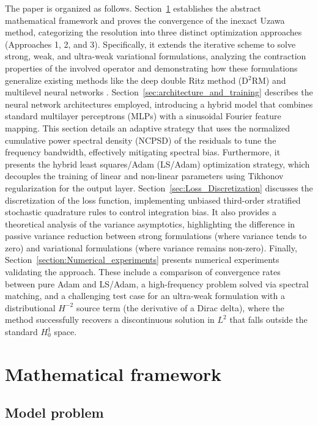 \documentclass{article}
\theoremstyle{definition}
\begin{document}
The paper is organized as follows. Section~\ref{sec:Math_framework} establishes the abstract mathematical framework and proves the convergence of the inexact Uzawa method, categorizing the resolution into three distinct optimization approaches (Approaches 1, 2, and 3). Specifically, it extends the iterative scheme to solve strong, weak, and ultra-weak variational formulations, analyzing the contraction properties of the involved operator and demonstrating how these formulations generalize existing methods like the deep double Ritz method (D$^2$RM) \cite{uriarte2023DoubleRitz} and multilevel neural networks \cite{aldirany2024multi, wang2024}. Section~\ref{sec:architecture_and_training} describes the neural network architectures employed, introducing a hybrid model that combines standard multilayer perceptrons (MLPs) with a sinusoidal Fourier feature mapping. This section details an adaptive strategy that uses the normalized cumulative power spectral density (NCPSD) of the residuals to tune the frequency bandwidth, effectively mitigating spectral bias. Furthermore, it presents the hybrid least squares/Adam (LS/Adam) optimization strategy, which decouples the training of linear and non-linear parameters using Tikhonov regularization for the output layer. Section~\ref{sec:Loss_Discretization} discusses the discretization of the loss function, implementing unbiased third-order stratified stochastic quadrature rules to control integration bias. It also provides a theoretical analysis of the variance asymptotics, highlighting the difference in passive variance reduction between strong formulations (where variance tends to zero) and variational formulations (where variance remains non-zero). Finally, Section~\ref{section:Numerical_experiments} presents numerical experiments validating the approach. These include a comparison of convergence rates between pure Adam and LS/Adam, a high-frequency problem solved via spectral matching, and a challenging test case for an ultra-weak formulation with a distributional $H^{-2}$ source term (the derivative of a Dirac delta), where the method successfully recovers a discontinuous solution in $L^2$ that falls outside the standard $H^1_0$ space.


\section{Mathematical framework}\label{sec:Math_framework}

\subsection{Model problem}
\end{document}
